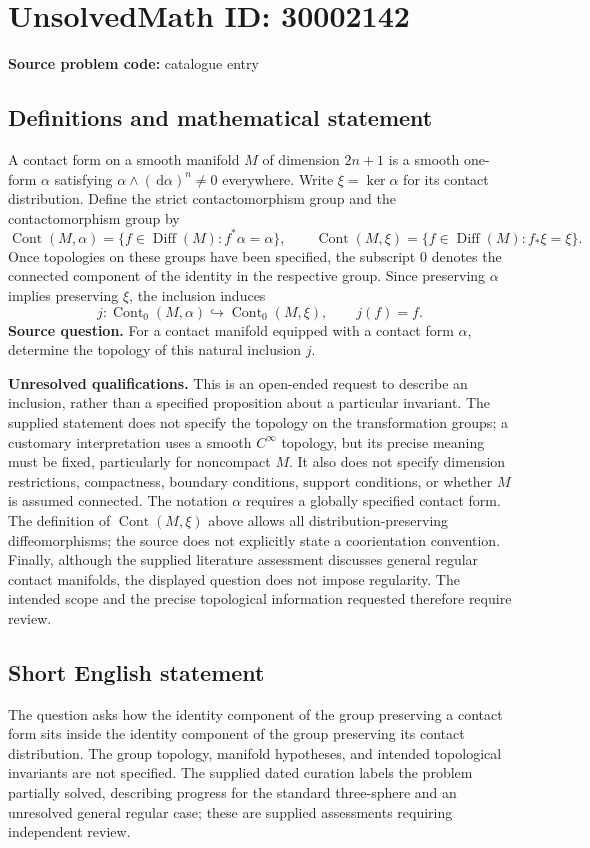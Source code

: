 \documentclass[11pt]{article}
\newcommand{\dd}{\,\mathrm{d}}
\begin{document}
\section*{UnsolvedMath ID: 30002142}
\textbf{Source problem code:} catalogue entry
\subsection{Definitions and mathematical statement}
A contact form on a smooth manifold \(M\) of dimension \(2n+1\) is a smooth one-form \(\alpha\) satisfying \(\alpha\wedge(\dd\alpha)^n\neq 0\) everywhere. Write \(\xi=\ker\alpha\) for its contact distribution. Define the strict contactomorphism group and the contactomorphism group by
\[
\operatorname{Cont}(M,\alpha)=\{f\in\operatorname{Diff}(M):f^*\alpha=\alpha\},
\qquad
\operatorname{Cont}(M,\xi)=\{f\in\operatorname{Diff}(M):f_*\xi=\xi\}.
\]
Once topologies on these groups have been specified, the subscript \(0\) denotes the connected component of the identity in the respective group. Since preserving \(\alpha\) implies preserving \(\xi\), the inclusion induces
\[
j:\operatorname{Cont}_0(M,\alpha)\hookrightarrow\operatorname{Cont}_0(M,\xi),\qquad j(f)=f.
\]
\textbf{Source question.} For a contact manifold equipped with a contact form \(\alpha\), determine the topology of this natural inclusion \(j\).

\textbf{Unresolved qualifications.} This is an open-ended request to describe an inclusion, rather than a specified proposition about a particular invariant. The supplied statement does not specify the topology on the transformation groups; a customary interpretation uses a smooth \(C^\infty\) topology, but its precise meaning must be fixed, particularly for noncompact \(M\). It also does not specify dimension restrictions, compactness, boundary conditions, support conditions, or whether \(M\) is assumed connected. The notation \(\alpha\) requires a globally specified contact form. The definition of \(\operatorname{Cont}(M,\xi)\) above allows all distribution-preserving diffeomorphisms; the source does not explicitly state a coorientation convention. Finally, although the supplied literature assessment discusses general regular contact manifolds, the displayed question does not impose regularity. The intended scope and the precise topological information requested therefore require review.
\subsection{Short English statement}
The question asks how the identity component of the group preserving a contact form sits inside the identity component of the group preserving its contact distribution. The group topology, manifold hypotheses, and intended topological invariants are not specified. The supplied dated curation labels the problem partially solved, describing progress for the standard three-sphere and an unresolved general regular case; these are supplied assessments requiring independent review.
\end{document}

